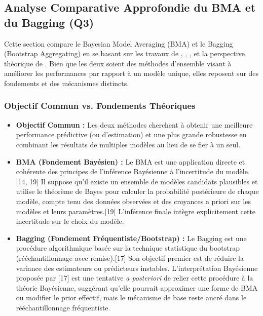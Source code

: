 \documentclass[11pt,a4paper]{article}
\begin{document}
\subsection{Analyse Comparative Approfondie du BMA et du Bagging (Q3)}

Cette section compare le Bayesian Model Averaging (BMA) et le Bagging (Bootstrap Aggregating) en se basant sur les travaux de \citet{Wasserman2000}, \citet{Domingos1997}, \citet{Domingos2012}, et la perspective théorique de \citet{Solomonoff1964}. Bien que les deux soient des méthodes d'ensemble visant à améliorer les performances par rapport à un modèle unique, elles reposent sur des fondements et des mécanismes distincts.

\subsubsection{Objectif Commun vs. Fondements Théoriques}
\begin{itemize}
    \item \textbf{Objectif Commun :} Les deux méthodes cherchent à obtenir une meilleure performance prédictive (ou d'estimation) et une plus grande robustesse en combinant les résultats de multiples modèles au lieu de se fier à un seul.
    \item \textbf{BMA (Fondement Bayésien) :} Le BMA est une application directe et cohérente des principes de l'inférence Bayésienne à l'incertitude du modèle.[14, 19] Il suppose qu'il existe un ensemble de modèles candidats plausibles et utilise le théorème de Bayes pour calculer la probabilité postérieure de chaque modèle, compte tenu des données observées et des croyances a priori sur les modèles et leurs paramètres.[19] L'inférence finale intègre explicitement cette incertitude sur le choix du modèle.
    \item \textbf{Bagging (Fondement Fréquentiste/Bootstrap) :} Le Bagging est une procédure algorithmique basée sur la technique statistique du bootstrap (rééchantillonnage avec remise).[17] Son objectif premier est de réduire la variance des estimateurs ou prédicteurs instables. L'interprétation Bayésienne proposée par \citet{Domingos1997} [17] est une tentative \textit{a posteriori} de relier cette procédure à la théorie Bayésienne, suggérant qu'elle pourrait approximer une forme de BMA ou modifier le prior effectif, mais le mécanisme de base reste ancré dans le rééchantillonnage fréquentiste.
\end{itemize}
\end{document}

